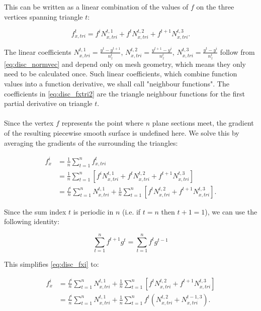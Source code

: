 \documentclass{article}
\begin{document}
This can be written as a linear combination of the values of $f$ on the three vertices spanning triangle $t$:

\begin{equation} \label{eq:disc_fxtri2}
f_{x,tri}^t = f^i N_{x,tri}^{t,1} + f^t N_{x,tri}^{t,2} + f^{t+1} N_{x,tri}^{t,3}.
\end{equation}

The linear coefficients $N_{x,tri}^{t,1} = \frac{y^t - y^{t+1}}{n_z^t}$, $N_{x,tri}^{t,2} = \frac{y^{t+1} - y^i}{n_z^t}$, $N_{x,tri}^{t,3} = \frac{y^t - y^i}{n_z^t}$ follow from \eqref{eq:disc_normvec} and depend only on mesh geometry, which means they only need to be calculated once. Such linear coefficients, which combine function values into a function derivative, we shall call "neighbour functions". The coefficients in \eqref{eq:disc_fxtri2} are the triangle neighbour functions for the first partial derivative on triangle $t$.\\
\\
Since the vertex $f$ represents the point where $n$ plane sections meet, the gradient of the resulting piecewise smooth surface is undefined here. We solve this by averaging the gradients of the surrounding the triangles:

\begin{equation} \label{eq:disc_fxi}
\begin{split}
f_x^i &= \frac{1}{n} \sum_{t=1}^n f_{x,tri}^t \\
 &= \frac{1}{n} \sum_{t=1}^n \left[ f^i N_{x,tri}^{t,1} + f^t N_{x,tri}^{t,2} + f^{t+1} N_{x,tri}^{t,3} \right] \\
 &= \frac{f^i}{n} \sum_{t=1}^n N_{x,tri}^{t,1} + \frac{1}{n} \sum_{t=1}^n \left[ f^t N_{x,tri}^{t,2} + f^{t+1} N_{x,tri}^{t,3} \right].
\end{split}
\end{equation}

Since the sum index $t$ is periodic in $n$ (i.e. if $t=n$ then $t+1=1$), we can use the following identity:

\begin{equation*}
\sum_{t=1}^n f^{t+1} g^t = \sum_{t=1}^n f^t g^{t-1}
\end{equation*}

This simplifies \eqref{eq:disc_fxi} to:

\begin{equation} \label{eq:disc_fxi2}
\begin{split}
f_x^i &= \frac{f^i}{n} \sum_{t=1}^n N_{x,tri}^{t,1} + \frac{1}{n} \sum_{t=1}^n \left[ f^t N_{x,tri}^{t,2} + f^{t+1} N_{x,tri}^{t,3} \right] \\
 &= \frac{f^i}{n} \sum_{t=1}^n N_{x,tri}^{t,1} + \frac{1}{n} \sum_{t=1}^n f^t ( N_{x,tri}^{t,2} + N_{x,tri}^{t-1,3} ).
\end{split}
\end{equation}
\end{document}
